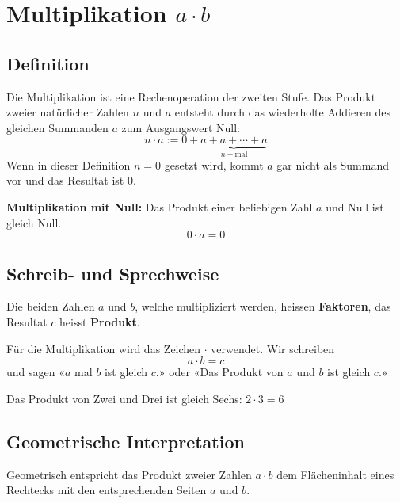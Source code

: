 \newpage
\section{Multiplikation $a\cdot b$}

\subsection{Definition}
Die Multiplikation ist eine Rechenoperation der zweiten Stufe. Das Produkt zweier natürlicher Zahlen $n$ und $a$ entsteht durch das wiederholte Addieren des gleichen Summanden $a$ zum Ausgangswert Null:
\[
  n\cdot a := 0+\underbrace{a+a+\cdots+a}_{n-\text{mal}}
\]
Wenn in dieser Definition $n=0$ gesetzt wird, kommt $a$ gar nicht als Summand vor und das Resultat ist $0$.
\begin{theorem}
  \textbf{Multiplikation mit Null:} Das Produkt einer beliebigen Zahl $a$ und Null ist gleich Null.
  \[
    0 \cdot a = 0
  \]
\end{theorem}

\subsection{Schreib- und Sprechweise}
Die beiden Zahlen $a$ und $b$, welche multipliziert werden, heissen \textbf{Faktoren}, das Resultat $c$ heisst \textbf{Produkt}.

Für die Multiplikation wird das Zeichen $\cdot$ verwendet. Wir schreiben
\[
  a \cdot b = c
\]
und sagen «$a$ mal $b$ ist gleich $c$.» oder «Das Produkt von $a$ und $b$ ist gleich $c$.»
\begin{example}
  Das Produkt von Zwei und Drei ist gleich Sechs: $2 \cdot 3 = 6$
\end{example}

\subsection{Geometrische Interpretation}

Geometrisch entspricht das Produkt zweier Zahlen $a\cdot b$ dem Flächeninhalt eines Rechtecks mit den entsprechenden Seiten $a$ und $b$.


